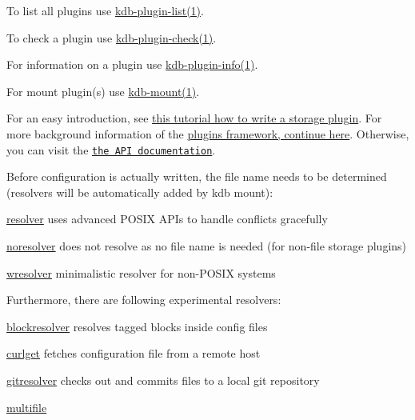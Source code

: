 \begin{DoxyItemize}
\item To list all plugins use \hyperlink{doc_help_kdb-plugin-list_md}{kdb-\/plugin-\/list(1)}.
\item To check a plugin use \hyperlink{doc_help_kdb-plugin-check_md}{kdb-\/plugin-\/check(1)}.
\item For information on a plugin use \hyperlink{doc_help_kdb-plugin-info_md}{kdb-\/plugin-\/info(1)}.
\item For mount plugin(s) use \hyperlink{doc_help_kdb-mount_md}{kdb-\/mount(1)}.
\end{DoxyItemize}

For an easy introduction, see \hyperlink{doc_tutorials_plugins_md}{this tutorial how to write a storage plugin}. For more background information of the \hyperlink{doc_dev_plugins-framework_md}{plugins framework, continue here}. Otherwise, you can visit the \href{https://doc.libelektra.org/api/latest/html/group__plugin.html}{\tt the A\+PI documentation}.

Before configuration is actually written, the file name needs to be determined (resolvers will be automatically added by kdb mount)\+:


\begin{DoxyItemize}
\item \hyperlink{autotoc_md579_src_plugins_resolver_README_md}{resolver} uses advanced P\+O\+S\+IX A\+P\+Is to handle conflicts gracefully
\item \hyperlink{autotoc_md479_src_plugins_noresolver_README_md}{noresolver} does not resolve as no file name is needed (for non-\/file storage plugins)
\item \hyperlink{autotoc_md765_src_plugins_wresolver_README_md}{wresolver} minimalistic resolver for non-\/\+P\+O\+S\+IX systems
\end{DoxyItemize}

Furthermore, there are following experimental resolvers\+:


\begin{DoxyItemize}
\item \hyperlink{autotoc_md64_src_plugins_blockresolver_README_md}{blockresolver} resolves tagged blocks inside config files
\item \hyperlink{autotoc_md139_src_plugins_curlget_README_md}{curlget} fetches configuration file from a remote host
\item \hyperlink{autotoc_md232_src_plugins_gitresolver_README_md}{gitresolver} checks out and commits files to a local git repository
\item \hyperlink{autotoc_md448_src_plugins_multifile_README_md}{multifile}
\end{DoxyItemize}

